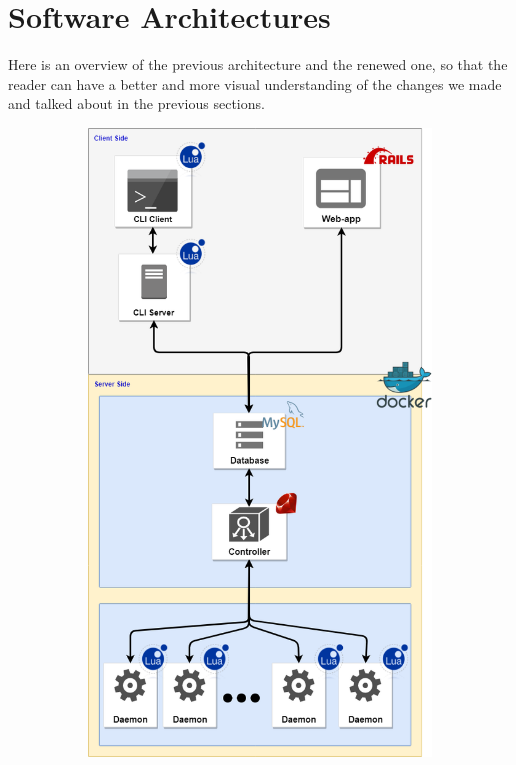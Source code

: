 \documentclass{eplmastersthesis}
\begin{document}
    \section{Software Architectures}

      Here is an overview of the previous architecture and the renewed one,
      so that the reader can have a better and more visual understanding
      of the changes we made and talked about in the previous sections.

      \begin{figure}[!tbp]
        \centering
        \begin{subfigure}{0.45\textwidth}
          \includegraphics[width=\textwidth]{figures/prev_arch.png}

\end{subfigure}
\end{figure}
\end{document}
